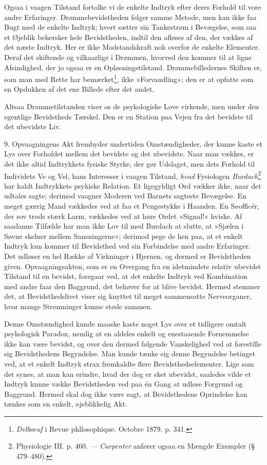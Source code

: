 \documentclass[12pt,a4paper,openany]{book}
\newcommand{\opage}[1]{\marginnote{\footnotesize\textit{[#1]}}}
\begin{document}
Ogsaa i vaagen Tilstand fortolke vi de enkelte Indtryk efter deres
Forhold til vore andre Erfaringer. Drømmebevidstheden følger samme
Metode, men kan ikke faa Bugt
\opage{95}med de enkelte Indtryk; hvert sætter sin Tankestrøm i
Bevægelse, som saa et Øjeblik behersker hele Bevidstheden, indtil den
afløses af den, der vækkes af det næste Indtryk. Her er ikke
Modstandskraft nok overfor de enkelte Elementer. Deraf det skiftende og
vilkaarlige i Drømmen, hvorved den kommer til at ligne Afsindighed, der
jo ogsaa er en Opløsningstilstand. Drømmebilledernes Skiften er, som man
med Rette har bemærket\footnote[1]{\emph{Delboeuf} i Revue
phllosophique. Octobre 1879. p. 341.}, ikke »Forvandling«; den er at
opfatte som en Opdukken af det ene Billede efter det andet.

Altsaa Drømmetilstanden viser os de psykologiske Love virkende, men
under den egentlige Bevidstheds Tærskel. Den er en Station paa Vejen fra
det bevidste til det ubevidste Liv.

9. Opvaagningens Akt frembyder undertiden Omstændigheder, der kunne
kaste et Lys over Forholdet mellem det bevidste og det ubevidste. Naar
man vækkes, er det ikke altid Indtrykkets fysiske Styrke, der gør
Udslaget, men dets Forhold til Individets Ve og Vel, hans Interesser i
vaagen Tilstand, \emph{hvad} Fysiologen
\emph{Burdach}\footnote[2]{Physiologie III. p. 460. --- \emph{Carpenter}
anfører ogsaa en Mængde Exempler (§ 479--480).} har kaldt Indtrykkets
psykiske Relation. Et ligegyldigt Ord vækker ikke, naar det udtales
sagte; derimod vaagner Moderen ved Barnets sagteste Bevægelse. En meget
gærrig Mand vækkedes ved at faa et Pengestykke i Haanden. En Søofficér,
der sov trods stærk Larm, vækkedes ved at høre Ordet »Signal!« hviske.
Af saadanne Tilfælde har man ikke Lov til med Burdach at slutte, at
»Sjælen i Søvne skelner mellem Sansningerne«; derimod pege de hen paa,
at et enkelt Indtryk kun kommer til Bevidsthed ved sin Forbindelse med
andre Erfaringer. Det udløser en hel Række af Virkninger i Hjernen, og
dermed er Bevidstheden given. Opvaagningsakten, som er en Overgang fra
en idetmindste relativ ubevidst Tilstand til en bevidst, foregaar ved,
at det enkelte Indtryk ved Kombination med andre faar den Baggrund, det
behøver for at blive bevidst. Hermed stemmer det, at Bevidsthedslivet
viser sig knyttet til meget sammensatte Nerveorganer, hvor mange
Strømninger kunne støde sammen.


\opage{96}Denne Omstændighed kunde maaske kaste noget Lys over et
tidligere omtalt psykologisk Paradox, nemlig at en aldeles enkelt og
enestaaende Fornemmelse ikke kan være bevidst, og over den dermed
følgende Vanskelighed ved at forestille sig Bevidsthedens Begyndelse.
Man kunde tænke sig denne Begyndelse betinget ved, at et enkelt Indtryk
strax fremkaldte flere Bevidsthedselementer. Lige som det synes, at man
kan erindre, hvad der dog er sket ubevidst, saaledes vilde et Indtryk
knnne vække Bevidstheden ved paa én Gang at udløse Forgrund og Baggrund.
Hermed skal dog ikke være sagt, at Bevidsthedens Oprindelse kan tænkes
som en enkelt, øjeblikkelig Akt.
\end{document}
